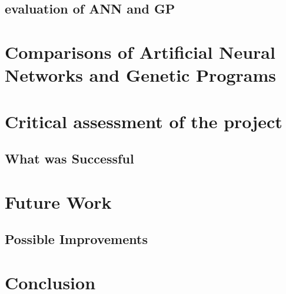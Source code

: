 \documentclass[11pt]{article}
\begin{document}



\subsection{evaluation of ANN and GP }

\newpage
\section{Comparisons of Artificial Neural Networks and Genetic Programs}
\newpage
\section{Critical assessment of the project }
\subsection{What was Successful}

\newpage
\section{Future Work}
\subsection{Possible Improvements}

\newpage
\section{Conclusion}
\end{document}
